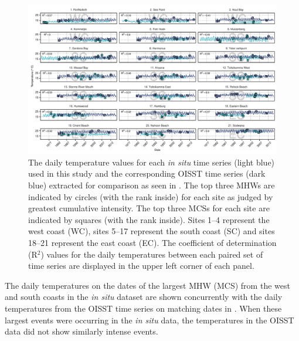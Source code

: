 \documentclass[a4paper,10pt,review]{elsarticle}
\begin{document}
\begin{figure}
\centering
\includegraphics[width=1.0\textwidth]{figure2.pdf}
\caption{The daily temperature values for each \emph{in situ} time series (light blue) used in this study and the corresponding OISST time series (dark blue) extracted for comparison as seen in . The top three MHWs are indicated by circles (with the rank inside) for each site as judged by greatest cumulative intensity. The top three MCSs for each site are indicated by squares (with the rank inside). Sites 1--4 represent the west coast (WC), sites 5--17 represent the south coast (SC) and sites 18--21 represent the east coast (EC). The coefficient of determination (R$^2$) values for the daily temperatures between each paired set of time series are displayed in the upper left corner of each panel.}
\label{fig:Figure2}
\end{figure}

The daily temperatures on the dates of the largest MHW (MCS) from the west and south coasts in the \emph{in situ} dataset are shown concurrently with the daily temperatures from the OISST time series on matching dates in . When these largest events were occurring in the \emph{in situ} data, the temperatures in the OISST data did not show similarly intense events.
\end{document}

